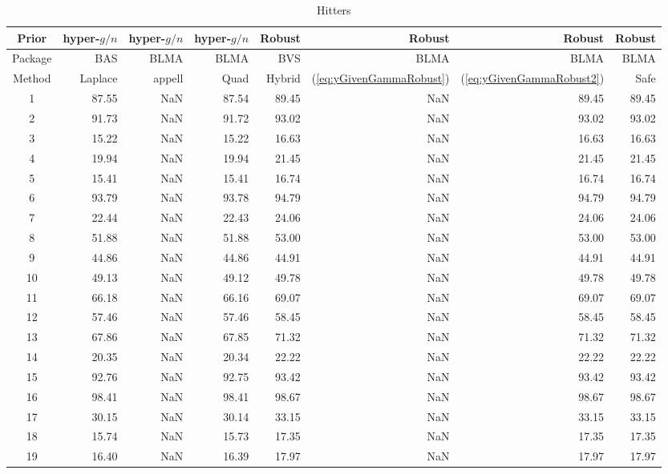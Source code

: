 \documentclass{article}[12pt]
\begin{document}
\begin{table}[ht]
	\centering
	{\small 
	\begin{tabular}{c|rrr|rrrr}
		Prior   & hyper-$g/n$ & hyper-$g/n$ & hyper-$g/n$ & Robust &  Robust & Robust & Robust \\		
		\hline
		Package & BAS         & BLMA        & BLMA        & BVS & BLMA & BLMA & BLMA  \\
		\hline 
		Method  & Laplace     & appell      & Quad  & Hybrid & (\ref{eq:yGivenGammaRobust}) & (\ref{eq:yGivenGammaRobust2}) & Safe \\ 
		\hline
		1 & 87.55 & NaN & 87.54 & 89.45 & NaN & 89.45 & 89.45 \\ 
		2 & 91.73 & NaN & 91.72 & 93.02 & NaN & 93.02 & 93.02 \\ 
		3 & 15.22 & NaN & 15.22 & 16.63 & NaN & 16.63 & 16.63 \\ 
		4 & 19.94 & NaN & 19.94 & 21.45 & NaN & 21.45 & 21.45 \\ 
		5 & 15.41 & NaN & 15.41 & 16.74 & NaN & 16.74 & 16.74 \\ 
		6 & 93.79 & NaN & 93.78 & 94.79 & NaN & 94.79 & 94.79 \\ 
		7 & 22.44 & NaN & 22.43 & 24.06 & NaN & 24.06 & 24.06 \\ 
		8 & 51.88 & NaN & 51.88 & 53.00 & NaN & 53.00 & 53.00 \\ 
		9 & 44.86 & NaN & 44.86 & 44.91 & NaN & 44.91 & 44.91 \\ 
		10 & 49.13 & NaN & 49.12 & 49.78 & NaN & 49.78 & 49.78 \\ 
		11 & 66.18 & NaN & 66.16 & 69.07 & NaN & 69.07 & 69.07 \\ 
		12 & 57.46 & NaN & 57.46 & 58.45 & NaN & 58.45 & 58.45 \\ 
		13 & 67.86 & NaN & 67.85 & 71.32 & NaN & 71.32 & 71.32 \\ 
		14 & 20.35 & NaN & 20.34 & 22.22 & NaN & 22.22 & 22.22 \\ 
		15 & 92.76 & NaN & 92.75 & 93.42 & NaN & 93.42 & 93.42 \\ 
		16 & 98.41 & NaN & 98.41 & 98.67 & NaN & 98.67 & 98.67 \\ 
		17 & 30.15 & NaN & 30.14 & 33.15 & NaN & 33.15 & 33.15 \\ 
		18 & 15.74 & NaN & 15.73 & 17.35 & NaN & 17.35 & 17.35 \\ 
		19 & 16.40 & NaN & 16.39 & 17.97 & NaN & 17.97 & 17.97 \\ 
		\hline
	\end{tabular}
}
	\caption{Hitters}
	\label{tab:HittersResults2}
\end{table}
\end{document}
